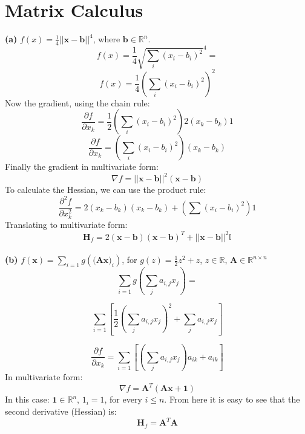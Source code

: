 \documentclass{article}
\begin{document}
\section{Matrix Calculus}
\textbf{(a)} $f(x) = \frac{1}{4}||\textbf{x} - \textbf{b}||^4$, where $\textbf{b} \in\mathbb{R}^n$.\\
\begin{equation*}
    f(x) = \frac{1}{4}\sqrt{\sum_i (x_i-b_i)^2}^4 = 
\end{equation*}
\begin{equation*}
    f(x) = \frac{1}{4}\left(\sum_i (x_i - b_i)^2\right)^2
\end{equation*}
Now the gradient, using the chain rule:
\begin{equation*}
    \frac{\partial f}{\partial x_k} = \frac{1}{2}\left(\sum_i (x_i - b_i)^2\right) 2(x_k - b_k)1
\end{equation*}
\begin{equation*}
    \frac{\partial f}{\partial x_k} = \left(\sum_i (x_i - b_i)^2\right) (x_k - b_k)
\end{equation*}
Finally the gradient in multivariate form:
\begin{equation*}
    \nabla f = ||\textbf{x} - \textbf{b}||^2(\textbf{x} - \textbf{b})
\end{equation*}
To calculate the Hessian, we can use the product rule:
\begin{equation*}
    \frac{\partial^2 f}{\partial x_k^2} = 2(x_k - b_k)(x_k - b_k) + \left(\sum (x_i - b_i)^2\right)1
\end{equation*}
Translating to multivariate form:
\begin{equation*}
    \textbf{H}_f = 2(\textbf{x} - \textbf{b})(\textbf{x} - \textbf{b})^T + ||\textbf{x} - \textbf{b}||^2\mathbb{I}
\end{equation*}\\

\textbf{(b)} $f(\textbf{x}) = \sum_{i=1}g(\textbf{(Ax)}_i)$, for $g(z) = \frac{1}{2}z^2 + z$, $z \in\mathbb{R}$, $\textbf{A}\in\mathbb{R}^{n\times n}$
\begin{equation*}
    \sum_{i=1}g(\sum_j a_{i,j}x_{j})=
\end{equation*}

\begin{equation*}
    \sum_{i=1}\left[\frac{1}{2}(\sum_j a_{i,j}x_{j})^2 + \sum_j a_{i,j}x_{j}\right]
\end{equation*}

\begin{equation*}
    \frac{\partial f}{\partial x_k} = \sum_{i=1}\left[(\sum_j a_{i,j}x_{j})a_{ik} + a_{ik}\right]
\end{equation*}
In multivariate form:
\begin{equation*}
    \nabla f = \textbf{A}^T(\textbf{Ax} + \textbf{1})
\end{equation*}
In this case: $ \textbf{1}\in\mathbb{R}^n$, $1_i = 1$, for every $i \leq n$. From here it is easy to see that the second derivative (Hessian) is:
\begin{equation*}
    \textbf{H}_f = \textbf{A}^T\textbf{A}
\end{equation*}\\
\end{document}
